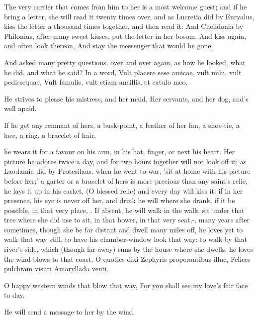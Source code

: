 {The very carrier that comes from him to her is a most welcome guest;
and if he bring a letter, she will read it twenty times over, and as
 Lucretia did by Euryalus, kiss the letter a thousand times
together, and then read it: And Chelidonia by Philonius, after
many sweet kisses, put the letter in her bosom,
And kiss again, and often look thereon,
And stay the messenger that would be gone:

And asked many pretty questions, over and over again, as how he looked,
what he did, and what he said? In a word,
Vult placere sese amicae, vult mihi, vult pedissequae,
Vult famulis, vult etiam ancillis, et catulo meo.

He strives to please his mistress, and her maid,
Her servants, and her dog, and's well apaid.

If he get any remnant of hers, a busk-point, a feather of her fan, a
shoe-tie, a lace, a ring, a bracelet of hair,

he wears it for a favour on his arm, in his hat, finger, or next his
heart. Her picture he adores twice a day, and for two hours together
will not look off it; as Laodamia did by Protesilaus, when he went to
war, 'sit at home with his picture before her;' a garter or a
bracelet of hers is more precious than any saint's relic, he lays it up
in his casket, (O blessed relic) and every day will kiss it: if in her
presence, his eye is never off her, and drink he will where she drank,
if it be possible, in that very place, \etc{}. If absent, he will walk in
the walk, sit under that tree where she did use to sit, in that bower,
in that very seat,-, many years
after sometimes, though she be far distant and dwell many miles off, he
loves yet to walk that way still, to have his chamber-window look that
way: to walk by that river's side, which (though far away) runs by the
house where she dwells, he loves the wind blows to that coast.
O quoties dixi Zephyris properantibus illuc,
Felices pulchram visuri Amaryllada venti.

O happy western winds that blow that way,
For you shall see my love's fair face to day.

He will send a message to her by the wind.

}
